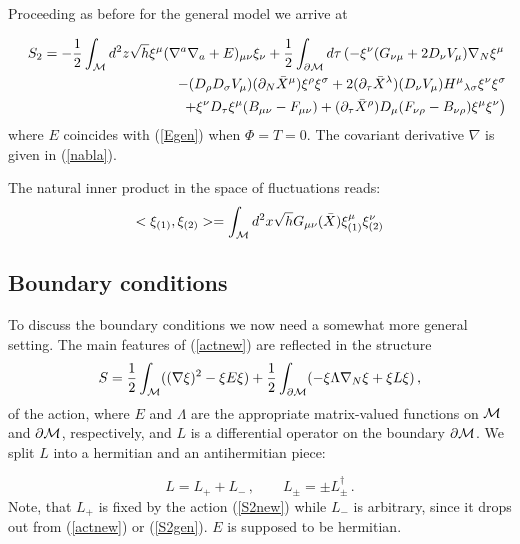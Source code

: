 \documentclass[a4paper,12pt]{article}
\begin{document}
Proceeding as before for the general model we arrive at

\begin{eqnarray}
&&S_2 =-\frac 12 \int _{\cal M}d^{2}z\sqrt{h} \xi^\mu (\nabla^a
\nabla_a +E)_{\mu\nu} \xi_\nu +\frac 12 \int _{\partial {\cal M}}d\tau 
\left(-\xi^\nu (G_{\nu\mu}+2D_\nu V_\mu )\nabla_N \xi^\mu  \right.
\nonumber \\
&&\quad -(D_\rho D_\sigma V_\mu )(\partial_N\bar X^\mu )\xi^\rho
\xi^\sigma +2(\partial_\tau \bar X^\lambda )(D_\nu V_\mu )
{H^\mu}_{\lambda\sigma}\xi^\nu \xi^\sigma \label{S2new} \\
&&\quad  \left. +\xi^\nu D_\tau \xi^\mu (B_{\mu\nu}-F_{\mu\nu}) +
(\partial_\tau \bar X^\rho ) D_\mu (F_{\nu\rho}-B_{\nu\rho})\xi^\mu\xi^\nu
\right) \nonumber
\end{eqnarray}
where $E$ coincides with (\ref{Egen}) when $\Phi =T=0$.
The covariant derivative $\nabla$ is given in (\ref{nabla}).

The natural inner product in the space of fluctuations reads:
\begin{equation}
<\xi_{(1)},\xi_{(2)}>=\int_{\cal M}d^2 x\sqrt{h} G_{\mu\nu} (\bar X)
\xi_{(1)}^\mu \xi_{(2)}^\nu
\label{innprod}
\end{equation}

\subsection{Boundary conditions}
\label{bcsection}
To discuss the boundary conditions we now need a somewhat 
more general setting. 
The main features of (\ref{actnew}) are reflected in the structure  
\begin{equation}
S=\frac 12 \int_{\cal M} ((\nabla \xi )^2 -\xi E \xi )
+\frac 12 \int_{\partial {\cal M}} 
(-\xi \Lambda \nabla_N \xi +\xi L \xi )\,,
\label{S2gen}
\end{equation}
of the action, where $E$ and $\Lambda$ are the appropriate matrix-valued 
functions on ${\cal M}$ and $\partial {\cal M}$, respectively, and
$L$ is a differential operator on the boundary $\partial {\cal M}$.
We split $L$ into a hermitian and an antihermitian piece:  

\begin{equation}
L=L_++L_-\,,\qquad L_\pm =\pm L_\pm^\dag \,. \label{split}
\end{equation}
Note, that $L_+$ is fixed by the action (\ref{S2new}) while
$L_-$ is arbitrary, since it drops out from 
(\ref{actnew}) or (\ref{S2gen}).  $E$ is supposed to be hermitian.
\end{document}
